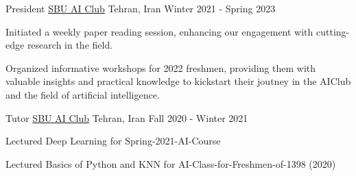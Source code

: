 \begin{cventries}

  \cventry%
    {President} %
    {\href{https://www.linkedin.com/company/sbu-ai-club/}{SBU AI Club}} %
    {Tehran, Iran} %
    {Winter 2021 - Spring 2023} %
    {%
      \begin{cvitems} %
      	\item {Initiated a weekly paper reading session, enhancing our engagement with cutting-edge research in the field.}
	\item {Organized informative workshops for 2022 freshmen, providing them with valuable insights and practical knowledge to kickstart their joutney in the AIClub and the field of artificial intelligence.}
      \end{cvitems}
    }


  \cventry%
    {Tutor} %
    {\href{https://www.linkedin.com/company/sbu-ai-club/}{SBU AI Club}} %
    {Tehran, Iran} %
    {Fall 2020 - Winter 2021} %
    {%
      \begin{cvitems} %
        \item {Lectured Deep Learning for Spring-2021-AI-Course}
        \item {Lectured Basics of Python and KNN for AI-Class-for-Freshmen-of-1398 (2020)}
      \end{cvitems}
    }


\end{cventries}
